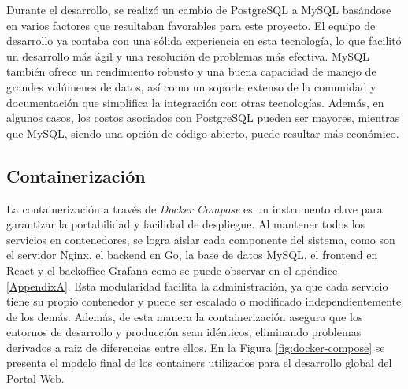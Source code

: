 Durante el desarrollo, se realizó un cambio de PostgreSQL a MySQL basándose en varios factores que resultaban favorables para este proyecto. El equipo de desarrollo ya contaba con una sólida experiencia en esta tecnología, lo que facilitó un desarrollo más ágil y una resolución de problemas más efectiva. MySQL también ofrece un rendimiento robusto y una buena capacidad de manejo de grandes volúmenes de datos, así como un soporte extenso de la comunidad y documentación que simplifica la integración con otras tecnologías. Además, en algunos casos, los costos asociados con PostgreSQL pueden ser mayores, mientras que MySQL, siendo una opción de código abierto, puede resultar más económico.

\subsection{Containerización}

La containerización a través de \textit{Docker Compose} es un instrumento clave para garantizar la portabilidad y facilidad de despliegue. Al mantener todos los servicios en contenedores, se logra aislar cada componente del sistema, como son el servidor Nginx, el backend en Go, la base de datos MySQL, el frontend en React y el backoffice Grafana como se puede observar en el apéndice \ref{AppendixA}. Esta modularidad facilita la administración, ya que cada servicio tiene su propio contenedor y puede ser escalado o modificado independientemente de los demás. Además, de esta manera la containerización asegura que los entornos de desarrollo y producción sean idénticos, eliminando problemas derivados a raiz de diferencias entre ellos. 
En la Figura \ref{fig:docker-compose} se presenta el modelo final de los containers utilizados para el desarrollo global del Portal Web.

